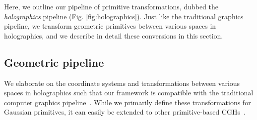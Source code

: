 \label{sec:holographics}

Here, we outline our pipeline of primitive transformations, dubbed the \textit{holographics} pipeline (Fig. \ref{fig:holographics}). Just like the traditional graphics pipeline, we transform geometric primitives between various spaces in holographics, and we describe in detail these conversions in this section.
\subsection{Geometric pipeline}
We elaborate on the coordinate systems and transformations between various spaces in holographics such that our framework is compatible with the traditional computer graphics pipeline~\cite{foley1996computer, blinn1996jim}. While we primarily define these transformations for Gaussian primitives, it can easily be extended to other primitive-based CGHs~\cite{matsushima2003fast, chen2009computer}.

